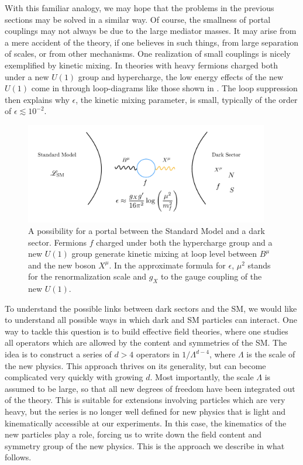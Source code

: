 With this familiar analogy, we may hope that the problems in the previous sections may be solved in a similar way. Of course, the smallness of portal couplings may not always be due to the large mediator masses. It may arise from a mere accident of the theory, if one believes in such things, from large separation of scales, or from other mechanisms. One realization of small couplings is nicely exemplified by kinetic mixing. In theories with heavy fermions charged both under a new $U(1)$ group and hypercharge, the low energy effects of the new $U(1)$ come in through loop-diagrams like those shown in . The loop suppression then explains why $\epsilon$, the kinetic mixing parameter, is small, typically of the order of $\epsilon \lesssim 10^{-2}$.
%
\begin{figure}[t]
 \includegraphics[width=0.95\textwidth]{Dark_sectors.pdf}
 \caption[A possibility for a portal coupling and why it is small.]{A possibility for a portal between the Standard Model and a dark sector. Fermions $f$ charged under both the hypercharge group and a new $U(1)$ group generate kinetic mixing at loop level between $B^\mu$ and the new boson $X^\mu$. In the approximate formula for $\epsilon$, $\mu^2$ stands for the renormalization scale and $g_X$ to the gauge coupling of the new $U(1)$. \label{fig:Dark_sectors}}
\end{figure}
%

To understand the possible links between dark sectors and the SM, we would like to understand all possible ways in which dark and SM particles can interact. One way to tackle this question is to build effective field theories, where one studies all operators which are allowed by the content and symmetries of the SM. The idea is to construct a series of $d>4$ operators in $1/\Lambda^{d-4}$, where $\Lambda$ is the scale of the new physics. This approach thrives on its generality, but can become complicated very quickly with growing $d$. Most importantly, the scale $\Lambda$ is assumed to be large, so that all new degrees of freedom have been integrated out of the theory. This is suitable for extensions involving particles which are very heavy, but the series is no longer well defined for new physics that is light and kinematically accessible at our experiments. In this case, the kinematics of the new particles play a role, forcing us to write down the field content and symmetry group of the new physics. This is the approach we describe in what follows.

